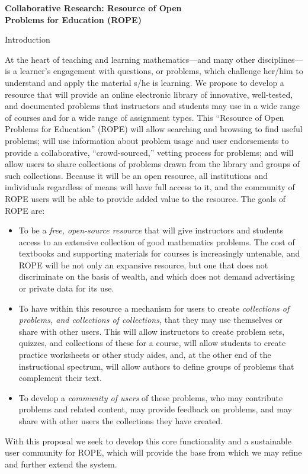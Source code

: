\documentclass[11pt]{article}
\begin{document}
\begin{center}
{\Large \textbf{Collaborative Research: Resource of Open\\
Problems for Education (ROPE)}}
\end{center}

\begin{section}{Introduction}

At the heart of teaching and learning mathematics---and many other
disciplines---is a learner's engagement with questions, or problems, which
challenge her/him to understand and apply the material s/he is
learning.  We propose to develop a resource that will provide an online
electronic library of innovative, well-tested, and documented problems
that instructors and students may use in a wide range of courses and for a
wide range of assignment types.  This ``Resource of Open Problems for
Education'' (ROPE) will allow searching and browsing to find useful
problems; will use information about problem usage and user endorsements
to provide a collaborative, ``crowd-sourced,'' vetting process for problems;
and will allow users to share collections of problems drawn from the
library and groups of such collections.  Because it will be an open
resource, all institutions and individuals regardless of means will have
full access to it, and the community of ROPE users will be able to provide
added value to the resource.  The goals of ROPE are:
\begin{itemize}
  \item
    To be a \textit{free, open-source resource} that will give instructors
    and students access to an extensive collection of good mathematics
    problems.  The cost of textbooks and supporting materials for courses
    is increasingly untenable, and ROPE will be not only an expansive
    resource, but one that does not discriminate on the basis of wealth,
    and which does not demand advertising or private data for its use.
  \item
    To have within this resource a mechanism for users to create
    \textit{collections of problems, and collections of collections,} that
    they may use themselves or share with other users.  This will allow
    instructors to create problem sets, quizzes, and collections of these
    for a course, will allow students to create practice
    worksheets or other study aides, and, at the other end of the
    instructional spectrum, will allow authors to define groups of
    problems that complement their text.
  \item
    To develop a \textit{community of users} of these problems, who may
    contribute problems and related content, may provide feedback on
    problems, and may share with other users the collections they have
    created.
\end{itemize}
With this proposal we seek to develop this core functionality and a
sustainable user community for ROPE, which will provide the base from
which we may refine and further extend the system.

\end{section}
\end{document}
